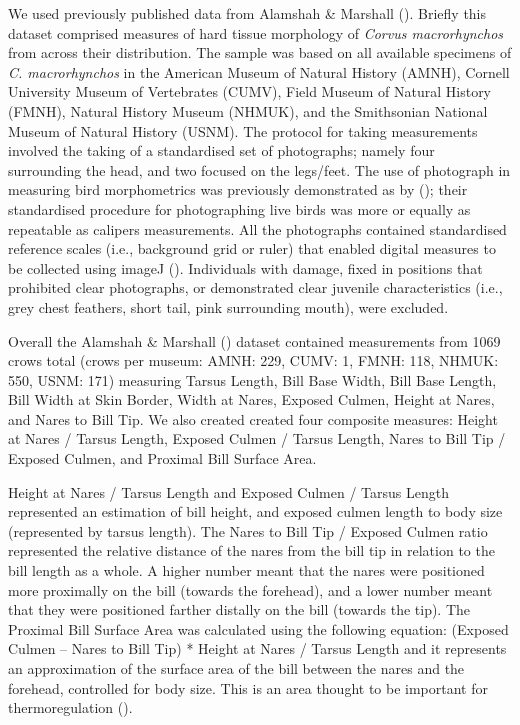 \documentclass[10pt,a4paper]{article}
\begin{document}
We used previously published data from Alamshah \& Marshall ().
Briefly this dataset comprised measures of hard tissue morphology of \emph{Corvus macrorhynchos} from across their distribution.
The sample was based on all available specimens of \emph{C. macrorhynchos} in the American Museum of Natural History (AMNH), Cornell University Museum of Vertebrates (CUMV), Field Museum of Natural History (FMNH), Natural History Museum (NHMUK), and the Smithsonian National Museum of Natural History (USNM).
The protocol for taking measurements involved the taking of a standardised set of photographs; namely four surrounding the head, and two focused on the legs/feet.
The use of photograph in measuring bird morphometrics was previously demonstrated as by (); their standardised procedure for photographing live birds was more or equally as repeatable as calipers measurements.
All the photographs contained standardised reference scales (i.e., background grid or ruler) that enabled digital measures to be collected using imageJ ().
Individuals with damage, fixed in positions that prohibited clear photographs, or demonstrated clear juvenile characteristics (i.e., grey chest feathers, short tail, pink surrounding mouth), were excluded.

Overall the Alamshah \& Marshall () dataset contained measurements from 1069 crows total (crows per museum: AMNH: 229, CUMV: 1, FMNH: 118, NHMUK: 550, USNM: 171) measuring Tarsus Length, Bill Base Width, Bill Base Length, Bill Width at Skin Border, Width at Nares, Exposed Culmen, Height at Nares, and Nares to Bill Tip.
We also created created four composite measures: Height at Nares / Tarsus Length, Exposed Culmen / Tarsus Length, Nares to Bill Tip / Exposed Culmen, and Proximal Bill Surface Area.

Height at Nares / Tarsus Length and Exposed Culmen / Tarsus Length represented an estimation of bill height, and exposed culmen length to body size (represented by tarsus length).
The Nares to Bill Tip / Exposed Culmen ratio represented the relative distance of the nares from the bill tip in relation to the bill length as a whole.
A higher number meant that the nares were positioned more proximally on the bill (towards the forehead), and a lower number meant that they were positioned farther distally on the bill (towards the tip).
The Proximal Bill Surface Area was calculated using the following equation: (Exposed Culmen -- Nares to Bill Tip) * Height at Nares / Tarsus Length and it represents an approximation of the surface area of the bill between the nares and the forehead, controlled for body size.
This is an area thought to be important for thermoregulation ().
\end{document}
